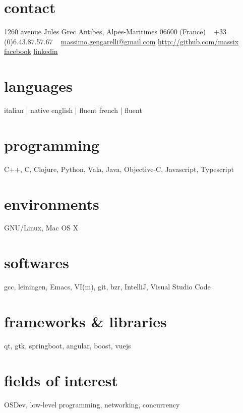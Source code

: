 \documentclass[]{friggeri-cv}
\begin{document}


\begin{aside} %
  \section{contact}
  1260 avenue Jules Grec
  Antibes, Alpes-Maritimes
  06600 (France)
  ~
  +33 (0)6.43.87.57.67
  ~
  \href{mailto:massimo.gengarelli@gmail.com}{massimo.gengarelli@gmail.com}
  \href{https://github.com/massix/}{http://github.com/massix}
  \href{https://facebook.com/massimo.gengarelli}{facebook}
  \href{https://fr.linkedin.com/pub/massimo-gengarelli/46/375/468/}{linkedin}
  \section{languages}
  italian | native
  english | fluent
  french  | fluent
  \section{programming}
  C++, C, Clojure, Python,
  Vala, Java, Objective-C,
  Javascript, Typescript
  \section{environments}
  GNU/Linux, Mac OS X
  \section{softwares}
  gcc, leiningen, Emacs,
  VI(m), git, bzr, IntelliJ,
  Visual Studio Code
  \section{frameworks \& libraries}
  qt, gtk, springboot, angular,
  boost, vuejs
  \section{fields of interest}
  OSDev, low-level programming,
  networking, concurrency
\end{aside}

\end{document}

